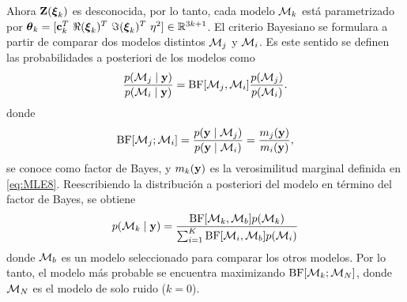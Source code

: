 Ahora $\mathbf{Z}(\boldsymbol{\xi}_k)$ es desconocida, por lo tanto, cada modelo $\mathcal{M}_k$ está parametrizado por $\vectheta_k = [\c_k^T\ \Re(\vecxi_k)^T\ \Im(\vecxi_k)^T\ \eta^2]\in\R^{3k+1}$.  El criterio Bayesiano se formulara a partir de comparar dos modelos distintos $\mathcal{M}_j$ y $\mathcal{M}_i$. Es este sentido se definen las probabilidades a posteriori de los modelos como
\begin{equation}
	\frac{p(\mathcal{M}_j\mid \mathbf{y})}{p(\mathcal{M}_i\mid \mathbf{y})} = \mathrm{BF}[\mathcal{M}_j,\mathcal{M}_i]\frac{p(\mathcal{M}_j)}{p(\mathcal{M}_i)}.
	\label{eq:BIC7}
\end{equation}
donde 
\begin{equation}
	\mathrm{BF}[\mathcal{M}_j;\mathcal{M}_i] = \frac{p(\mathbf{y}\mid\mathcal{M}_j)}{p(\mathbf{y}\mid\mathcal{M}_i)} = \frac{m_j(\mathbf{y})}{m_i(\mathbf{y})},
	\label{eq:BIC8}	
\end{equation}
se conoce como factor de Bayes, y $m_k(\mathbf{y})$ es la verosimilitud marginal definida en \eqref{eq:MLE8}. Reescribiendo la distribución a posteriori del modelo en término del factor de Bayes, se obtiene  
\begin{equation}
	p(\mathcal{M}_k\mid\mathbf{y}) = \frac{\mathrm{BF}[\mathcal{M}_k,\mathcal{M}_b]p(\mathcal{M}_k)}{\sum_{i=1}^{K}\mathrm{BF}[\mathcal{M}_i,\mathcal{M}_b]p(\mathcal{M}_i)}
	\label{eq:BIC9}
\end{equation}
donde $\mathcal{M}_b$ es un modelo seleccionado para comparar los otros modelos. Por lo tanto, el modelo más probable se encuentra maximizando $\mathrm{BF}[\mathcal{M}_k; \mathcal{M}_N ]$, donde $\mathcal{M}_N$ es el modelo de solo ruido ($k=0$).


